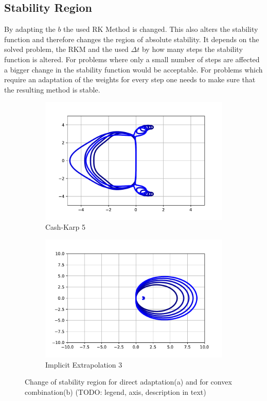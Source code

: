 \documentclass[a4paper]{scrartcl}
\numberwithin{equation}{section}
\theoremstyle{plain}
\theoremstyle{definition}
\numberwithin{theorem}{section}
\newcommand{\dt}{{\Delta t}}
\newcommand{\1}{\mathbbm{1}}
\begin{document}
\subsection{Stability Region}

By adapting the $b$ the used RK Method is changed. This also alters the stability function and therefore changes the region of absolute stability. 
It depends on the solved problem, the RKM and the used $\dt$ by how many steps the stability function is altered. For problems where only a small number of steps are affected a bigger change in the stability function would be acceptable. For problems which require an adaptation of the weights for every step one needs to make sure that the resulting method is stable.


\begin{figure}
     \centering
     \begin{subfigure}[b]{0.45\textwidth}
         \centering
         \includegraphics[width=\textwidth]{plots/stab_ck5.pdf}
         \caption{Cash-Karp 5}
         \label{fig:stab_ck5}
     \end{subfigure}
     \hfill
     \begin{subfigure}[b]{0.45\textwidth}
         \centering
         \includegraphics[width=\textwidth]{plots/stab_ex3.pdf}
         \caption{Implicit Extrapolation 3}
         \label{fig:stab_ex3}
     \end{subfigure}
        \caption{Change of stability region for direct adaptation(a) and for convex combination(b) (TODO: legend, axis, description in text)}
        \label{fig:stab}
\end{figure}
\end{document}

